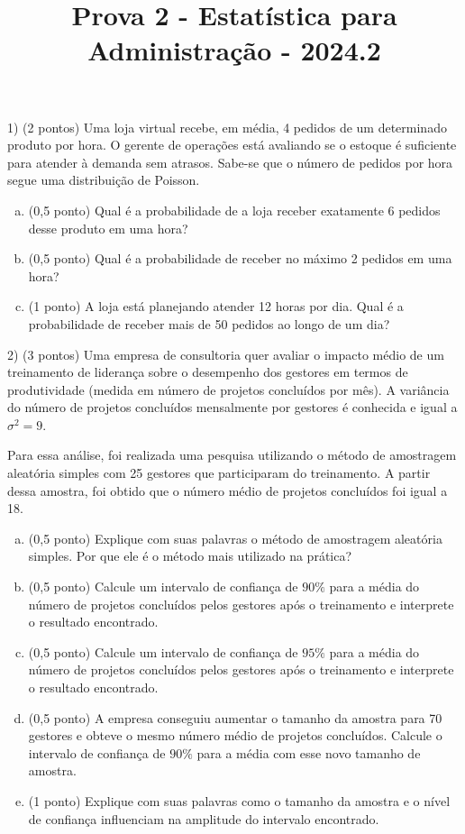 \documentclass{article}
\title{Prova 2 - Estatística para Administração - 2024.2}
\begin{document}
\date{}
\maketitle

1) (2 pontos) Uma loja virtual recebe, em média, 4 pedidos de um determinado produto por hora. O gerente de operações está avaliando se o estoque é suficiente para atender à demanda sem atrasos. Sabe-se que o número de pedidos por hora segue uma distribuição de Poisson.

\begin{enumerate}[a)]
    \item (0,5 ponto) Qual é a probabilidade de a loja receber exatamente 6 pedidos desse produto em uma hora?
    \item (0,5 ponto) Qual é a probabilidade de receber no máximo 2 pedidos em uma hora?
    \item (1 ponto) A loja está planejando atender 12 horas por dia. Qual é a probabilidade de receber mais de 50 pedidos ao longo de um dia?
\end{enumerate}

\vspace{5px}

2) (3 pontos) Uma empresa de consultoria quer avaliar o impacto médio de um treinamento de liderança sobre o desempenho dos gestores em termos de produtividade (medida em número de projetos concluídos por mês). A variância do número de projetos concluídos mensalmente por gestores é conhecida e igual a \( \sigma^2 = 9 \).  

Para essa análise, foi realizada uma pesquisa utilizando o método de amostragem aleatória simples com 25 gestores que participaram do treinamento. A partir dessa amostra, foi obtido que o número médio de projetos concluídos foi igual a 18.  

\begin{enumerate}[a)]
    \item (0,5 ponto) Explique com suas palavras o método de amostragem aleatória simples. Por que ele é o método mais utilizado na prática?
    \item (0,5 ponto) Calcule um intervalo de confiança de \( 90\% \) para a média do número de projetos concluídos pelos gestores após o treinamento e interprete o resultado encontrado. 
    \item (0,5 ponto) Calcule um intervalo de confiança de \( 95\% \) para a média do número de projetos concluídos pelos gestores após o treinamento e interprete o resultado encontrado.
    \item (0,5 ponto) A empresa conseguiu aumentar o tamanho da amostra para 70 gestores e obteve o mesmo número médio de projetos concluídos. Calcule o  intervalo de confiança de \( 90\% \) para a média com esse novo tamanho de amostra. 
    \item (1 ponto) Explique com suas palavras como o tamanho da amostra e o nível de confiança influenciam na amplitude do intervalo encontrado. 
\end{enumerate}
\end{document}
